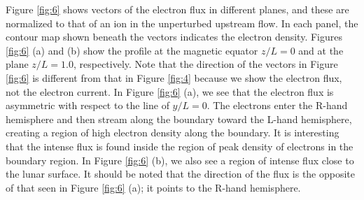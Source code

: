 \documentclass[draft,jgrga]{agutex2015}
\begin{document}
\begin{article}
Figure \ref{fig:6} shows vectors of the electron flux in different planes, and these are
normalized to that of an ion in the unperturbed upstream flow.
%
In each panel, the contour map shown beneath the vectors indicates the electron density.
Figures \ref{fig:6} (a) and (b) show the profile 
at the magnetic equator $z/L=0$ and at the plane $z/L=1.0$, respectively. 
Note that the direction of the vectors in Figure \ref{fig:6} is
different from that in Figure \ref{fig:4} because 
we show the electron flux, not the electron current.
In Figure \ref{fig:6} (a),  
we see that the electron flux is asymmetric with respect to the line of $y/L=0$.
The electrons enter the R-hand hemisphere  
and then stream along the boundary toward the L-hand hemisphere, creating a region of high electron density along the boundary.
It is interesting that the intense flux is found inside the region of peak density of electrons in the boundary region.
In Figure \ref{fig:6} (b),
we also see a region of intense flux close to the lunar surface.
It should be noted that the direction of the flux is the 
opposite of that seen in Figure \ref{fig:6} (a); it points to the R-hand hemisphere.


\end{article}
\end{document}
